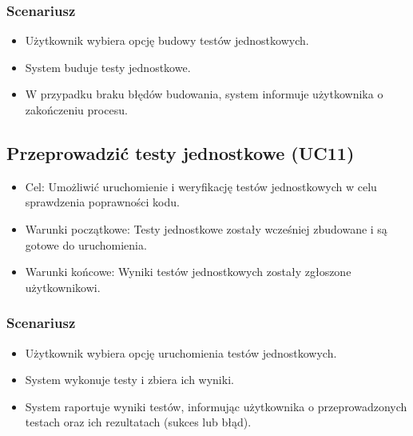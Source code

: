 \subsubsection{Scenariusz}
\begin{itemize}
    \item Użytkownik wybiera opcję budowy testów jednostkowych.
    \item System buduje testy jednostkowe.
    \item W przypadku braku błędów budowania, system informuje użytkownika o zakończeniu procesu.
\end{itemize}

\subsection{Przeprowadzić testy jednostkowe (UC11)}
\begin{itemize}
    \item Cel: Umożliwić uruchomienie i weryfikację testów jednostkowych w celu sprawdzenia poprawności kodu.
    \item Warunki początkowe: Testy jednostkowe zostały wcześniej zbudowane i są gotowe do uruchomienia.
    \item Warunki końcowe: Wyniki testów jednostkowych zostały zgłoszone użytkownikowi.
\end{itemize}

\subsubsection{Scenariusz}
\begin{itemize}
    \item Użytkownik wybiera opcję uruchomienia testów jednostkowych.
    \item System wykonuje testy i zbiera ich wyniki.
    \item System raportuje wyniki testów, informując użytkownika o przeprowadzonych testach oraz ich rezultatach (sukces lub błąd).
\end{itemize} 
